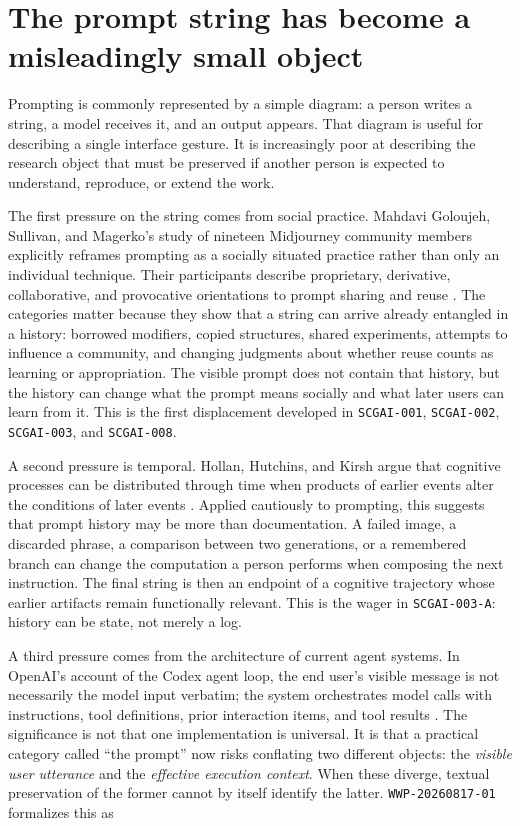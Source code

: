 \documentclass[11pt]{article}
\newcommand{\zettel}[1]{\texttt{#1}}
\begin{document}
\section{The prompt string has become a misleadingly small object}

Prompting is commonly represented by a simple diagram: a person writes a string, a model receives it, and an output appears. That diagram is useful for describing a single interface gesture. It is increasingly poor at describing the research object that must be preserved if another person is expected to understand, reproduce, or extend the work.

The first pressure on the string comes from social practice. Mahdavi Goloujeh, Sullivan, and Magerko's study of nineteen Midjourney community members explicitly reframes prompting as a socially situated practice rather than only an individual technique. Their participants describe proprietary, derivative, collaborative, and provocative orientations to prompt sharing and reuse \cite{mahdavigoloujeh2024social}. The categories matter because they show that a string can arrive already entangled in a history: borrowed modifiers, copied structures, shared experiments, attempts to influence a community, and changing judgments about whether reuse counts as learning or appropriation. The visible prompt does not contain that history, but the history can change what the prompt means socially and what later users can learn from it. This is the first displacement developed in \zettel{SCGAI-001}, \zettel{SCGAI-002}, \zettel{SCGAI-003}, and \zettel{SCGAI-008}.

A second pressure is temporal. Hollan, Hutchins, and Kirsh argue that cognitive processes can be distributed through time when products of earlier events alter the conditions of later events \cite{hollan2000distributed}. Applied cautiously to prompting, this suggests that prompt history may be more than documentation. A failed image, a discarded phrase, a comparison between two generations, or a remembered branch can change the computation a person performs when composing the next instruction. The final string is then an endpoint of a cognitive trajectory whose earlier artifacts remain functionally relevant. This is the wager in \zettel{SCGAI-003-A}: history can be state, not merely a log.

A third pressure comes from the architecture of current agent systems. In OpenAI's account of the Codex agent loop, the end user's visible message is not necessarily the model input verbatim; the system orchestrates model calls with instructions, tool definitions, prior interaction items, and tool results \cite{bolin2026codexloop}. The significance is not that one implementation is universal. It is that a practical category called ``the prompt'' now risks conflating two different objects: the \emph{visible user utterance} and the \emph{effective execution context}. When these diverge, textual preservation of the former cannot by itself identify the latter. \zettel{WWP-20260817-01} formalizes this as
\end{document}
